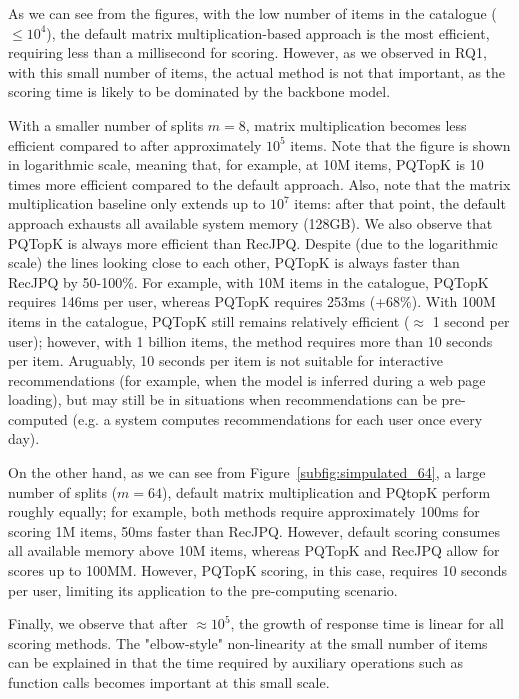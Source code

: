 \documentclass[sigconf,natbib=true, review=true]{acmart} %
\newcommand{\rsasha}[1]{\textcolor[HTML]{FF0000}{#1}}
\begin{document}
As we can see from the figures, with the low number of items in the catalogue ($\leq 10^4$), the default matrix multiplication-based approach is the most efficient, requiring less than a millisecond for scoring. However, as we observed in RQ1, with this small number of items, the actual method is not that important, as the scoring time is likely to be dominated by the backbone model. 

With a smaller number of splits $m=8$, matrix multiplication becomes less efficient compared to after approximately $10^5$ items. Note that the figure is shown in logarithmic scale, meaning that, for example, at 10M items, PQTopK is 10 times more efficient compared to the default approach. Also, note that the matrix multiplication baseline only extends up to $10^7$ items: after that point, the default approach exhausts all available system memory (128GB). We also observe that PQTopK is always more efficient than RecJPQ. Despite (due to the logarithmic scale) the lines looking close to each other, PQTopK is always faster than RecJPQ by 50-100\%. For example, with 10M items in the catalogue, PQTopK requires 146ms per user, whereas PQTopK requires 253ms (+68\%). With 100M items in the catalogue, PQTopK still remains relatively efficient ($\approx$ 1 second per user); however, with 1 billion items, the method requires more than 10 seconds per item. \rsasha{Aruguably, 10 seconds per item is not suitable for interactive recommendations (for example, when the model is inferred during a web page loading), but may still be in situations when recommendations can be pre-computed (e.g. a system computes recommendations for each user once every day). }

On the other hand, as we can see from Figure~\ref{subfig:simpulated_64}, a large number of splits ($m=64$), default matrix multiplication and PQtopK perform roughly equally; for example, both methods require approximately 100ms for scoring 1M items, \rsasha{50ms faster than RecJPQ}. However, default scoring consumes all available memory above 10M items, whereas PQTopK and RecJPQ allow for scores up to 100MM. However, PQTopK scoring, in this case, requires 10 seconds per user, limiting its application to the pre-computing scenario. 

Finally, we observe that after $\approx 10^5$, the growth of response time is linear for all scoring methods. The "elbow-style" non-linearity at the small number of items can be explained in that the time required by auxiliary operations such as function calls becomes important at this small scale. 
\end{document}
